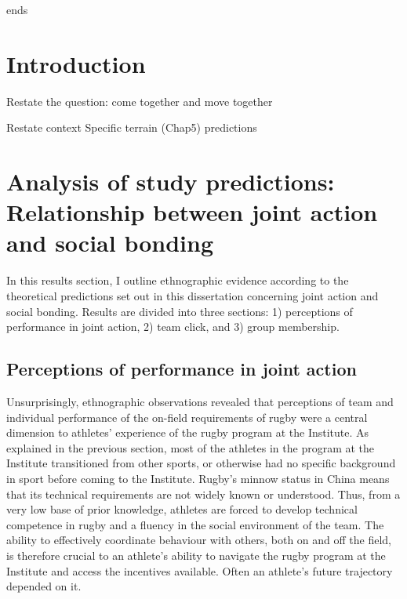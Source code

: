                                       \begin{CJK}{UTF8}{gbsn}
                                        ends




\section{Introduction}

Restate the question: come together and move together

Restate context
Specific terrain (Chap5)
predictions


\section{Analysis of study predictions: Relationship between joint action and social bonding}

In this results section, I outline ethnographic evidence according to the theoretical predictions set out in this dissertation concerning joint action and social bonding. Results are divided into three sections: 1) perceptions of performance in joint action, 2) team click, and 3) group membership.




\subsection{Perceptions of performance in joint action}
Unsurprisingly, ethnographic observations revealed that perceptions of team and individual performance of the on-field requirements of rugby were a central dimension to athletes' experience of the rugby program at the Institute.  As explained in the previous section, most of the athletes in the program at the Institute transitioned from other sports, or otherwise had no specific background in sport before coming to the Institute.  Rugby's minnow status in China means that its technical requirements are not widely known or understood.  Thus, from a very low base of prior knowledge, athletes are forced to develop technical competence in rugby and a fluency in the social environment of the team.  The ability to effectively coordinate behaviour with others, both on and off the field, is therefore crucial to an athlete's ability to navigate the rugby program at the Institute and access the incentives available.  Often an athlete's future trajectory depended on it.



\end{CJK}
